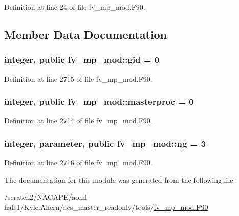 Definition at line 24 of file fv\-\_\-mp\-\_\-mod.\-F90.



\subsection{Member Data Documentation}
\subsubsection[{gid}]{\setlength{\rightskip}{0pt plus 5cm}integer, public fv\-\_\-mp\-\_\-mod\-::gid = 0}\label{classfv__mp__mod_a30b2cd26ed97df412ac7618005f079a5}


Definition at line 2715 of file fv\-\_\-mp\-\_\-mod.\-F90.

\subsubsection[{masterproc}]{\setlength{\rightskip}{0pt plus 5cm}integer, public fv\-\_\-mp\-\_\-mod\-::masterproc = 0}\label{classfv__mp__mod_a5040ccdc5ac106793b009fe1ec4bf5d1}


Definition at line 2714 of file fv\-\_\-mp\-\_\-mod.\-F90.

\subsubsection[{ng}]{\setlength{\rightskip}{0pt plus 5cm}integer, parameter, public fv\-\_\-mp\-\_\-mod\-::ng = 3}\label{classfv__mp__mod_ac41de456a8350a1ffd448c11ad07f923}


Definition at line 2716 of file fv\-\_\-mp\-\_\-mod.\-F90.



The documentation for this module was generated from the following file\-:\begin{DoxyCompactItemize}
\item 
/scratch2/\-N\-A\-G\-A\-P\-E/aoml-\/hafs1/\-Kyle.\-Ahern/acs\-\_\-master\-\_\-readonly/tools/\hyperlink{fv__mp__mod_8F90}{fv\-\_\-mp\-\_\-mod.\-F90}\end{DoxyCompactItemize}
